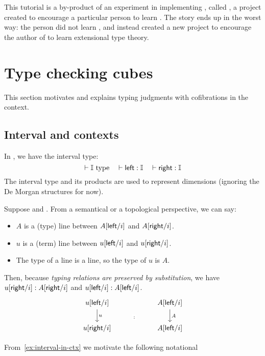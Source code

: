 This tutorial is a by-product of an experiment in implementing \CTT, called \GuestName,
a project created to encourage a particular person to learn \CTT.
The story ends up in the worst way: the person did not learn \CTT, and instead created
a new project to encourage the author of \GuestName{} to learn extensional type theory.

\section{Type checking cubes}\label{sec:tyck-cube}
This section motivates and explains typing judgments with cofibrations in the context.

\subsection{Interval and contexts}\label{sub:interval}
In \CTT, we have the interval type:
\[\vdash \mathbb{I}~\text{type}\quad \vdash \textsf{left}:\mathbb{I} \quad \vdash \textsf{right}:\mathbb{I}\]
The interval type and its products are used to represent dimensions
(ignoring the De Morgan structures for now).
\begin{example}\label{ex:interval-in-ctx}
Suppose  and .
From a semantical or a topological perspective, we can say:
\begin{itemize}
\item $A$ is a (type) line between $A[\textsf{left}/i]$ and $A[\textsf{right}/i]$.
\item $u$ is a (term) line between $u[\textsf{left}/i]$ and $u[\textsf{right}/i]$.
\item The type of a line is a line, so the type of $u$ is $A$.
\end{itemize}
Then, because \emph{typing relations are preserved by substitution},
we have $u[\textsf{right}/i]:A[\textsf{right}/i]$ and $u[\textsf{left}/i]:A[\textsf{left}/i]$.
\[\begin{tikzcd}
	{u[\lcon/i]} & {} & {A[\lcon/i]} \\
	{u[\rcon/i]} & {} & {A[\lcon/i]}
	\arrow["u", from=1-1, to=2-1]
	\arrow["A", from=1-3, to=2-3]
	\arrow["{:}"{description}, draw=none, from=1-2, to=2-2]
\end{tikzcd}\]
\end{example}
From~\cref{ex:interval-in-ctx} we motivate the following notational
